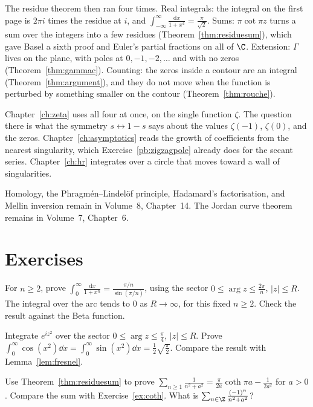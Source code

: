 The residue theorem then ran four times. Real integrals: the integral on the first page is $2\pi i$ times the residue at $i$, and $\int_{-\infty}^\infty\frac{\mathrm dx}{1+x^4}=\frac\pi{\sqrt2}$. Sums: $\pi\cot\pi z$ turns a sum over the integers into a few residues (Theorem~\ref{thm:residuesum}), which gave Basel a sixth proof and Euler's partial fractions on all of $\C$. Extension: $\Gamma$ lives on the plane, with poles at $0,-1,-2,\dots$ and with no zeros (Theorem~\ref{thm:gammac}). Counting: the zeros inside a contour are an integral (Theorem~\ref{thm:argument}), and they do not move when the function is perturbed by something smaller on the contour (Theorem~\ref{thm:rouche}).

Chapter~\ref{ch:zeta} uses all four at once, on the single function $\zeta$. The question there is what the symmetry $s\leftrightarrow 1-s$ says about the values $\zeta(-1)$, $\zeta(0)$, and the zeros. Chapter~\ref{ch:asymptotics} reads the growth of coefficients from the nearest singularity, which Exercise~\ref{pb:zigzagpole} already does for the secant series. Chapter~\ref{ch:hr} integrates over a circle that moves toward a wall of singularities.

Homology, the Phragm\'en--Lindel\"of principle, Hadamard's factorisation, and Mellin inversion remain in Volume~8, Chapter~14. The Jordan curve theorem remains in Volume~7, Chapter~6.

\section{Exercises}

\begin{exercise}[$\star\star$]\label{ex:xn}
For $n\ge2$, prove $\displaystyle\int_0^\infty\frac{\mathrm dx}{1+x^n}=\frac{\pi/n}{\sin(\pi/n)}$, using the sector $0\le\arg z\le\frac{2\pi}n$, $|z|\le R$. The integral over the arc tends to $0$ as $R\to\infty$, for this fixed $n\ge2$. Check the result against the Beta function.
\end{exercise}

\begin{exercise}[$\star\star$]\label{ex:fresnelsector}
Integrate $e^{iz^2}$ over the sector $0\le\arg z\le\frac\pi4$, $|z|\le R$. Prove $\displaystyle\int_0^\infty\cos(x^2)\dd x=\int_0^\infty\sin(x^2)\dd x=\frac12\sqrt{\frac\pi2}$. Compare the result with Lemma~\ref{lem:fresnel}.
\end{exercise}

\begin{exercise}[$\star$]\label{ex:cothres}
Use Theorem~\ref{thm:residuesum} to prove $\displaystyle\sum_{n\ge1}\frac1{n^2+a^2}=\frac\pi{2a}\coth\pi a-\frac1{2a^2}$ for $a>0$. Compare the sum with Exercise~\ref{ex:coth}. What is $\sum_{n\in\Z}\frac{(-1)^n}{n^2+a^2}$?
\end{exercise}

